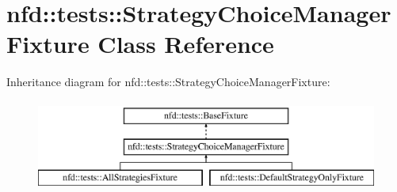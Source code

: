 \hypertarget{classnfd_1_1tests_1_1StrategyChoiceManagerFixture}{}\section{nfd\+:\+:tests\+:\+:Strategy\+Choice\+Manager\+Fixture Class Reference}
\label{classnfd_1_1tests_1_1StrategyChoiceManagerFixture}
Inheritance diagram for nfd\+:\+:tests\+:\+:Strategy\+Choice\+Manager\+Fixture\+:\begin{figure}[H]
\begin{center}
\leavevmode
\includegraphics[height=3.000000cm]{classnfd_1_1tests_1_1StrategyChoiceManagerFixture}
\end{center}
\end{figure}
